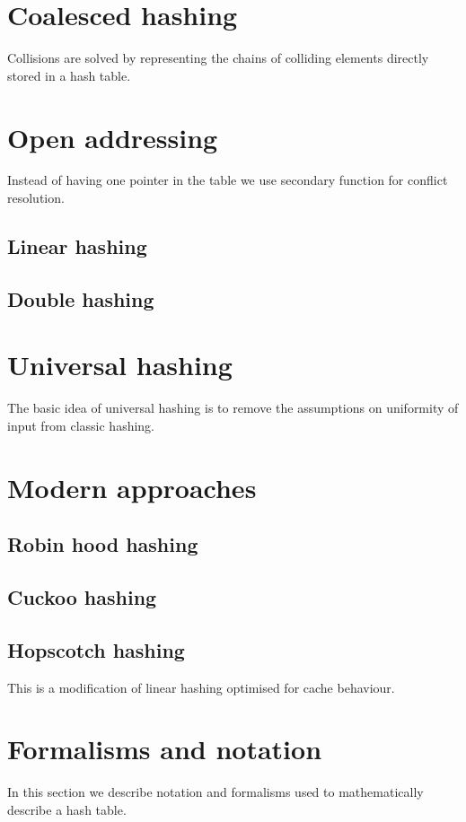 \section{Coalesced hashing}
Collisions are solved by representing the chains of colliding elements directly stored in a hash table. 

\section{Open addressing}
Instead of having one pointer in the table we use secondary function for conflict resolution.
\subsection{Linear hashing}
\subsection{Double hashing}

\section{Universal hashing}
The basic idea of universal hashing is to remove the assumptions on uniformity of input from classic hashing.

\section{Modern approaches}
\subsection{Robin hood hashing}
\subsection{Cuckoo hashing}
\subsection{Hopscotch hashing}
This is a modification of linear hashing optimised for cache behaviour.

\section{Formalisms and notation}
In this section we describe notation and formalisms used to mathematically describe a hash table.

